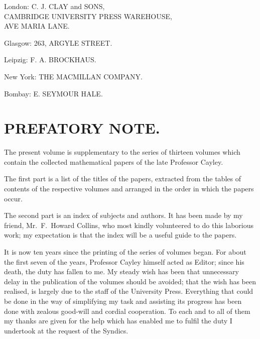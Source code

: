 \documentclass[11pt,a4paper]{book}
\begin{document}
\thispagestyle{empty}
\begin{center}
\vspace*{3cm}

{\normalsize London: C. J. CLAY and SONS,}\\
{\small CAMBRIDGE UNIVERSITY PRESS WAREHOUSE,}\\
{\small AVE MARIA LANE.}

\vspace{0.5cm}

{\small Glasgow: 263, ARGYLE STREET.}

\vspace{0.5cm}

{\small Leipzig: F. A. BROCKHAUS.}

\vspace{0.5cm}

{\small New York: THE MACMILLAN COMPANY.}

\vspace{0.5cm}

{\small Bombay: E. SEYMOUR HALE.}

\end{center}

\newpage

\section*{PREFATORY NOTE.}

The present volume is supplementary to the series of thirteen volumes which contain the collected mathematical papers of the late Professor Cayley.

The first part is a list of the titles of the papers, extracted from the tables of contents of the respective volumes and arranged in the order in which the papers occur.

The second part is an index of subjects and authors. It has been made by my friend, Mr.~F.~Howard Collins, who most kindly volunteered to do this laborious work; my expectation is that the index will be a useful guide to the papers.

It is now ten years since the printing of the series of volumes began. For about the first seven of the years, Professor Cayley himself acted as Editor; since his death, the duty has fallen to me. My steady wish has been that unnecessary delay in the publication of the volumes should be avoided; that the wish has been realised, is largely due to the staff of the University Press. Everything that could be done in the way of simplifying my task and assisting its progress has been done with zealous good-will and cordial cooperation. To each and to all of them my thanks are given for the help which has enabled me to fulfil the duty I undertook at the request of the Syndics.
\end{document}
